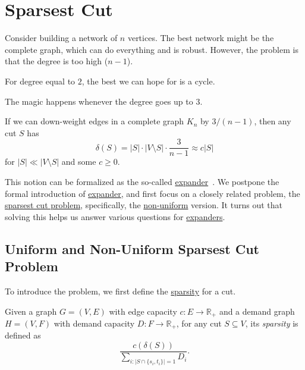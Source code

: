 \section{Sparsest Cut}
Consider building a network of \(n\) vertices. The best network might be the complete graph, which can do everything and is robust. However, the problem is that the degree is too high (\(n-1\)).

\begin{eg}
	For degree equal to \(2\), the best we can hope for is a cycle.
\end{eg}

The magic happens whenever the degree goes up to \(3\).

\begin{intuition}
	If we can down-weight edges in a complete graph \(K_n\) by \(3 / (n-1)\), then any cut \(S\) has
	\[
		\delta (S)
		= \lvert S \rvert \cdot \lvert V \setminus S \rvert \cdot \frac{3}{n-1}
		\approx c \lvert S \rvert
	\]
	for \(\lvert S \rvert \ll \lvert V \setminus S \rvert \) and some \(c \geq 0 \).
\end{intuition}

This notion can be formalized as the so-called \hyperref[def:expander]{expander}~\cite{hoory2006expander}. We postpone the formal introduction of \hyperref[def:expander]{expander}, and first focus on a closely related problem, the \hyperref[prb:sparsest-cut]{sparsest cut problem}, specifically, the \hyperref[prb:non-uniform-sparsest-cut]{non-uniform} version. It turns out that solving this helps us answer various questions for \hyperref[def:expander]{expanders}.

\subsection{Uniform and Non-Uniform Sparsest Cut Problem}
To introduce the problem, we first define the \hyperref[def:sparsity]{sparsity} for a cut.

\begin{definition}[Sparsity]\label{def:sparsity}
	Given a graph \(G = (V, E)\) with edge capacity \(c \colon E \to \mathbb{R} _{+}\) and a demand graph \(H = (V, F)\) with demand capacity \(D \colon F \to \mathbb{R} _{+}\), for any cut \(S \subseteq V\), its \emph{sparsity} is defined as
	\[
		\frac{c(\delta (S))}{\sum_{i \colon \lvert S \cap \{ s_i, t_i \} \rvert = 1} D_i}.
	\]
\end{definition}

